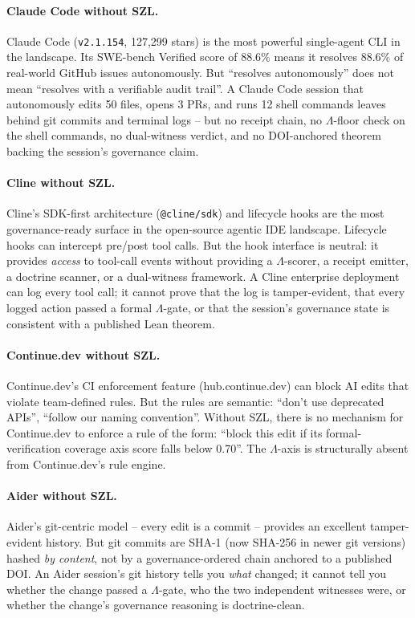 \paragraph{Claude Code without SZL.}
Claude Code (\texttt{v2.1.154}, 127,299 stars) is the most powerful
single-agent CLI in the landscape.  Its SWE-bench Verified score of 88.6\%
means it resolves 88.6\% of real-world GitHub issues autonomously.  But
``resolves autonomously'' does not mean ``resolves with a verifiable audit
trail''.  A Claude Code session that autonomously edits 50 files, opens 3
PRs, and runs 12 shell commands leaves behind git commits and terminal logs
-- but no receipt chain, no $\Lambda$-floor check on the shell commands, no
dual-witness verdict, and no DOI-anchored theorem backing the session's
governance claim.

\paragraph{Cline without SZL.}
Cline's SDK-first architecture (\texttt{@cline/sdk}) and lifecycle hooks
are the most governance-ready surface in the open-source agentic IDE
landscape.  Lifecycle hooks can intercept pre/post tool calls.  But the
hook interface is neutral: it provides \emph{access} to tool-call events
without providing a $\Lambda$-scorer, a receipt emitter, a doctrine scanner,
or a dual-witness framework.  A Cline enterprise deployment can log every
tool call; it cannot prove that the log is tamper-evident, that every logged
action passed a formal $\Lambda$-gate, or that the session's governance state
is consistent with a published Lean theorem.

\paragraph{Continue.dev without SZL.}
Continue.dev's CI enforcement feature (hub.continue.dev) can block AI edits
that violate team-defined rules.  But the rules are semantic: ``don't use
deprecated APIs'', ``follow our naming convention''.  Without SZL, there is
no mechanism for Continue.dev to enforce a rule of the form: ``block this
edit if its formal-verification coverage axis score falls below 0.70''.
The $\Lambda$-axis is structurally absent from Continue.dev's rule engine.

\paragraph{Aider without SZL.}
Aider's git-centric model -- every edit is a commit -- provides an excellent
tamper-evident history.  But git commits are SHA-1 (now SHA-256 in newer
git versions) hashed \emph{by content}, not by a governance-ordered chain
anchored to a published DOI.  An Aider session's git history tells you
\emph{what} changed; it cannot tell you whether the change passed a
$\Lambda$-gate, who the two independent witnesses were, or whether the change's
governance reasoning is doctrine-clean.

